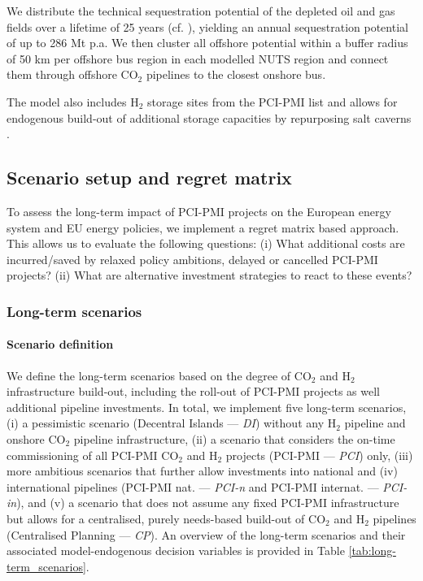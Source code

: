 \documentclass[pdflatex,sn-nature]{sn-jnl}%
\theoremstyle{thmstyleone}%
\theoremstyle{thmstyletwo}%
\theoremstyle{thmstylethree}%
\begin{document}
We distribute the technical sequestration potential of the depleted oil and gas fields over a lifetime of 25 years (cf. \cite{hofmannH2CO2Network2025}), yielding an annual sequestration potential of up to 286 Mt p.a. We then cluster all offshore potential within a buffer radius of 50 km per offshore bus region in each modelled NUTS region and connect them through offshore CO$_2$ pipelines to the closest onshore bus. 

The model also includes H$_2$ storage sites from the PCI-PMI list and allows for endogenous build-out of additional storage capacities by repurposing salt caverns \cite{neumannPotentialRoleHydrogen2023}.

\subsection{Scenario setup and regret matrix}\label{sec:scenario_setup}
To assess the long-term impact of PCI-PMI projects on the European energy system and EU energy policies, we implement a regret matrix based approach. This allows us to evaluate the following questions: (i) What additional costs are incurred/saved by relaxed policy ambitions, delayed or cancelled PCI-PMI projects? (ii) What are alternative investment strategies to react to these events? 

\subsubsection{Long-term scenarios}
\paragraph{Scenario definition}\label{sec:definition}
We define the long-term scenarios based on the degree of CO$_2$ and H$_2$ infrastructure build-out, including the roll-out of PCI-PMI projects as well additional pipeline investments. In total, we implement five long-term scenarios, (i) a pessimistic scenario (Decentral Islands --- \textit{DI}) without any H$_2$ pipeline and onshore CO$_2$ pipeline infrastructure, (ii) a scenario that considers the on-time commissioning of all PCI-PMI CO$_2$ and H$_2$ projects (PCI-PMI --- \textit{PCI}) only, (iii) more ambitious scenarios that further allow investments into national and (iv) international pipelines (PCI-PMI nat. --- \textit{PCI-n} and PCI-PMI internat. --- \textit{PCI-in}), and (v) a scenario that does not assume any fixed PCI-PMI infrastructure but allows for a centralised, purely needs-based build-out of CO$_2$ and H$_2$ pipelines (Centralised Planning --- \textit{CP}). An overview of the long-term scenarios and their associated model-endogenous decision variables is provided in Table \ref{tab:long-term_scenarios}. 
\end{document}

